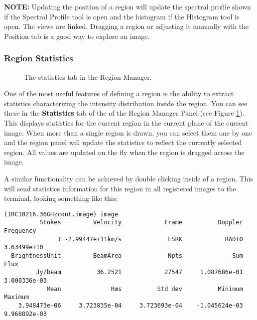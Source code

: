 {\bf NOTE:} Updating the position of a region will update the spectral profile shown if the Spectral Profile tool
is open and the histogram if the Histogram tool is open. The views are linked. Dragging a region or adjusting
it manually with the Position tab is a good way to explore an image.

\subsubsection{Region Statistics}
\label{section:display.viewerGUI.displaypanel.region.stats}

\begin{figure}[h!]
\begin{center}
\caption{\label{fig:viewer_regionstats} The statistics tab in the Region Manager.}
\hrulefill
\end{center}
\end{figure}

One of the most useful features of defining a region is the ability to extract statistics 
characterizing the intensity distribution inside the region. You can see these in the 
{\bf Statistics} tab of the of the Region Manager Panel (see Figure \ref{fig:viewer_regionstats}).
This displays statistics for the current region in the current plane of the current image.
When more than a single region is drawn, you can select them
one by one and the region panel will update the statistics to reflect the currently selected region. 
All values are updated on the fly when the region is dragged
across the image.


A similar functionality can be achieved by double clicking inside of a region. This will send
statistics information for this region in all registered images to the terminal, looking something like this:

\small
\begin{verbatim}
(IRC10216.36GHzcont.image) image
          Stokes         Velocity            Frame          Doppler        Frequency 
               I -2.99447e+11km/s             LSRK            RADIO      3.63499e+10 
  BrightnessUnit         BeamArea             Npts              Sum             Flux 
         Jy/beam          36.2521            27547     1.087686e-01     3.000336e-03 
            Mean              Rms          Std dev          Minimum          Maximum 
    3.948473e-06     3.723835e-04     3.723693e-04    -1.045624e-03     9.968892e-03 

\end{verbatim}
\normalsize

